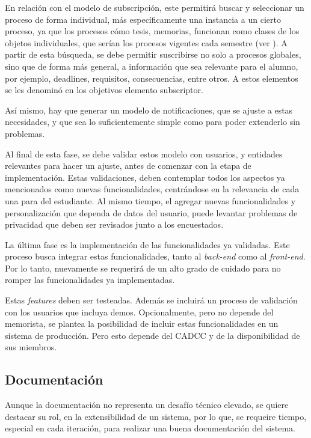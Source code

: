     \par En relación con el modelo de subscripción, este permitirá buscar y seleccionar un proceso de forma individual, más específicamente una instancia a un cierto proceso, ya que los procesos cómo tesis, memorias, funcionan como clases de los objetos individuales, que serían los procesos vigentes cada semestre (ver \cite{ARANCIBIA2021}).  A partir de esta búsqueda, se debe permitir suscribirse no solo a procesos globales, sino que de forma más general, a información que sea relevante para el alumno, por ejemplo, deadlines, requisitos, consecuencias, entre otros. A estos elementos se les denominó en los objetivos elemento subscriptor.
    
    \par Así mismo, hay que generar un modelo de notificaciones, que se ajuste a estas necesidades, y que sea lo suficientemente simple como para poder extenderlo sin problemas.
   
    \par Al final de esta fase, se debe validar estos modelo con usuarios, y entidades relevantes para hacer un ajuste, antes de comenzar con la etapa de implementación. Estas validaciones, deben contemplar todos los aspectos ya mencionados como nuevas funcionalidades, centrándose en la relevancia de cada una para del estudiante. Al mismo tiempo, el agregar nuevas funcionalidades y personalización que dependa de datos del usuario, puede levantar problemas de privacidad que deben ser revisados junto a los encuestados.

    \par La última fase es la implementación de las funcionalidades ya validadas. Este proceso busca integrar estas funcionalidades, tanto al \textit{back-end} como al \textit{front-end}. Por lo tanto, nuevamente se requerirá de un alto grado de cuidado para no romper las funcionalidades ya implementadas.
    \par Estas \textit{features} deben ser testeadas. Además se incluirá un proceso de validación con los usuarios que incluya demos. Opcionalmente, pero no depende del memorista, se plantea la posibilidad de incluir estas funcionalidades en un sistema de producción. Pero esto depende del CADCC y de la disponibilidad de sus miembros.
    \subsection{Documentación}
    \par Aunque la documentación no representa un desafío técnico elevado, se quiere destacar su rol, en la extensibilidad de un sistema, por lo que, se requeire tiempo, especial en cada iteración, para realizar una buena documentación del sistema.
    
